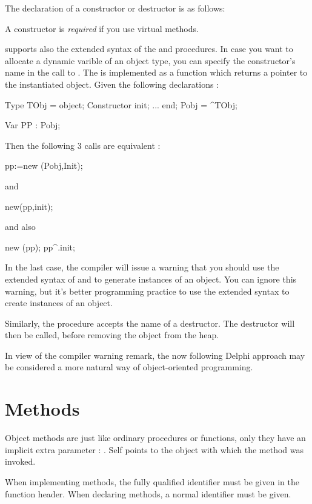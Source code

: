 \documentclass{report}
\begin{document}
The declaration of a constructor or destructor is as follows:



A constructor is {\em required} if you use virtual methods.

\fpc supports also the extended syntax of the  and 
procedures. In case you want to allocate a dynamic varible of an object
type, you can specify the constructor's name in the call to .
The  is implemented as a function which returns a pointer to the
instantiated object. Given the following declarations :
\begin{listing}
Type
  TObj = object;
   Constructor init;
   ...
   end;
  Pobj = ^TObj;

Var PP : Pobj;
\end{listing}  
Then the following 3 calls are equivalent :
\begin{listing}
 pp:=new (Pobj,Init);
\end{listing}
and
\begin{listing}
  new(pp,init);
\end{listing}
and also
\begin{listing}
  new (pp);
  pp^.init;
\end{listing}
In the last case, the compiler will issue a warning that you should use the
extended syntax of  and  to generate instances of an
object. You can ignore this warning, but it's better programming practice to
use the extended syntax to create instances of an object.

Similarly, the  procedure accepts the name of a destructor. The
destructor will then be called, before removing the object from the heap.

In view of the compiler warning remark, the now following Delphi approach may 
be considered a more natural way of object-oriented programming.

\section{Methods}

Object methods are just like ordinary procedures or functions, only they
have an implicit extra parameter : . Self points to the object
with which the method was invoked.

When implementing methods, the fully qualified identifier must be given
in the function header. When declaring methods, a normal identifier must be
given. 
\end{document}
